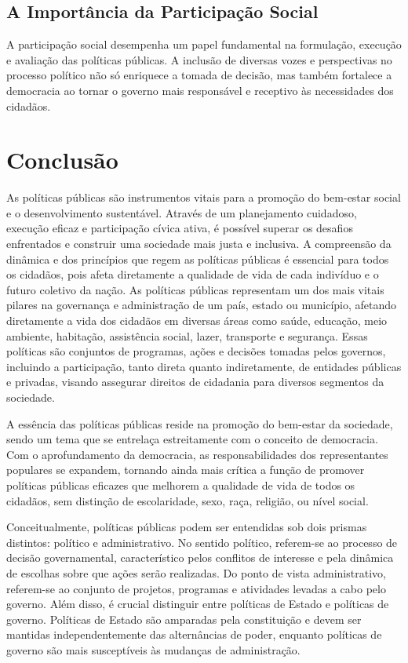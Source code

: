 \documentclass[
   article,       
   12pt,          
   oneside,       
   a4paper,       
   english,       
   brazil,        
   sumario=tradicional
   ]{abntex2}
\begin{document}
    \subsection{A Importância da Participação Social}
        A participação social desempenha um papel fundamental na formulação, execução e avaliação das políticas públicas. A inclusão de diversas vozes e perspectivas no processo político não só enriquece a tomada de decisão, mas também fortalece a democracia ao tornar o governo mais responsável e receptivo às necessidades dos cidadãos.
        
\section{Conclusão}
    As políticas públicas são instrumentos vitais para a promoção do bem-estar social e o desenvolvimento sustentável. Através de um planejamento cuidadoso, execução eficaz e participação cívica ativa, é possível superar os desafios enfrentados e construir uma sociedade mais justa e inclusiva. A compreensão da dinâmica e dos princípios que regem as políticas públicas é essencial para todos os cidadãos, pois afeta diretamente a qualidade de vida de cada indivíduo e o futuro coletivo da nação.
As políticas públicas representam um dos mais vitais pilares na governança e administração de um país, estado ou município, afetando diretamente a vida dos cidadãos em diversas áreas como saúde, educação, meio ambiente, habitação, assistência social, lazer, transporte e segurança. Essas políticas são conjuntos de programas, ações e decisões tomadas pelos governos, incluindo a participação, tanto direta quanto indiretamente, de entidades públicas e privadas, visando assegurar direitos de cidadania para diversos segmentos da sociedade.

A essência das políticas públicas reside na promoção do bem-estar da sociedade, sendo um tema que se entrelaça estreitamente com o conceito de democracia. Com o aprofundamento da democracia, as responsabilidades dos representantes populares se expandem, tornando ainda mais crítica a função de promover políticas públicas eficazes que melhorem a qualidade de vida de todos os cidadãos, sem distinção de escolaridade, sexo, raça, religião, ou nível social.

Conceitualmente, políticas públicas podem ser entendidas sob dois prismas distintos: político e administrativo. No sentido político, referem-se ao processo de decisão governamental, característico pelos conflitos de interesse e pela dinâmica de escolhas sobre que ações serão realizadas. Do ponto de vista administrativo, referem-se ao conjunto de projetos, programas e atividades levadas a cabo pelo governo. Além disso, é crucial distinguir entre políticas de Estado e políticas de governo. Políticas de Estado são amparadas pela constituição e devem ser mantidas independentemente das alternâncias de poder, enquanto políticas de governo são mais susceptíveis às mudanças de administração.
\end{document}
